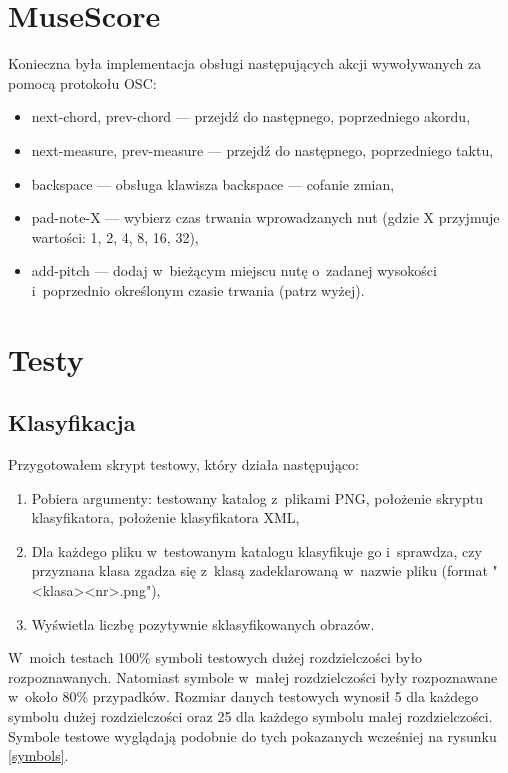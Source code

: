 \documentclass[polish,thesis,12pt]{dcsbook}
\begin{document}
\section{MuseScore}
Konieczna była implementacja obsługi następujących akcji wywoływanych za pomocą protokołu OSC:

\begin{itemize}
  \item next-chord, prev-chord --- przejdź do następnego, poprzedniego akordu,
  \item next-measure, prev-measure --- przejdź do następnego, poprzedniego taktu,
  \item backspace --- obsługa klawisza backspace --- cofanie zmian,
  \item pad-note-X --- wybierz czas trwania wprowadzanych nut (gdzie X przyjmuje wartości: 1, 2, 4, 8, 16, 32),
  \item add-pitch --- dodaj w~bieżącym miejscu nutę o~zadanej wysokości i~poprzednio określonym czasie trwania (patrz wyżej).
\end{itemize}

\section{Testy}
\subsection{Klasyfikacja}
Przygotowałem skrypt testowy, który działa następująco:

\begin{enumerate}
  \item Pobiera argumenty: testowany katalog z~plikami PNG, położenie skryptu klasyfikatora, położenie klasyfikatora XML,
  \item Dla każdego pliku w~testowanym katalogu klasyfikuje go i~sprawdza, czy przyznana klasa zgadza się z~klasą zadeklarowaną w~nazwie pliku (format "<klasa><nr>.png"),
  \item Wyświetla liczbę pozytywnie sklasyfikowanych obrazów.
\end{enumerate}

W~moich testach 100\% symboli testowych dużej rozdzielczości było rozpoznawanych. Natomiast symbole w~małej rozdzielczości były rozpoznawane w~około 80\% przypadków. Rozmiar danych testowych wynosił 5 dla każdego symbolu dużej rozdzielczości oraz 25 dla każdego symbolu małej rozdzielczości. Symbole testowe wyglądają podobnie do tych pokazanych wcześniej na rysunku \ref{symbols}.
\end{document}
